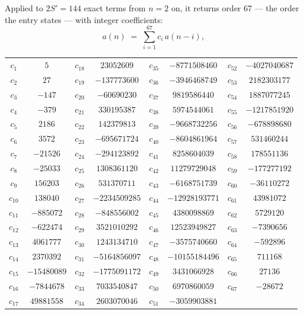 \documentclass[11pt,a4paper]{article}
\theoremstyle{plain}
\theoremstyle{definition}
\begin{document}
Applied to $2S'=144$ exact terms from $n=2$ on, it returns order $67$ --- the
order the entry states --- with integer coefficients:
\[
a(n)\;=\;\sum_{i=1}^{67}c_i\,a(n-i),
\]
\begin{center}\small
\begin{tabular}{cccccccc}
$c_{1}$ & $5$ & $c_{18}$ & $23052609$ & $c_{35}$ & $-8771508460$ & $c_{52}$ & $-4027040687$ \\
$c_{2}$ & $27$ & $c_{19}$ & $-137773600$ & $c_{36}$ & $-3946468749$ & $c_{53}$ & $2182303177$ \\
$c_{3}$ & $-147$ & $c_{20}$ & $-60690230$ & $c_{37}$ & $9819586440$ & $c_{54}$ & $1887077245$ \\
$c_{4}$ & $-379$ & $c_{21}$ & $330195387$ & $c_{38}$ & $5974544061$ & $c_{55}$ & $-1217851920$ \\
$c_{5}$ & $2186$ & $c_{22}$ & $142379813$ & $c_{39}$ & $-9668732256$ & $c_{56}$ & $-678898680$ \\
$c_{6}$ & $3572$ & $c_{23}$ & $-695671724$ & $c_{40}$ & $-8604861964$ & $c_{57}$ & $531460244$ \\
$c_{7}$ & $-21526$ & $c_{24}$ & $-294123892$ & $c_{41}$ & $8258604039$ & $c_{58}$ & $178551136$ \\
$c_{8}$ & $-25033$ & $c_{25}$ & $1308361120$ & $c_{42}$ & $11279729048$ & $c_{59}$ & $-177277192$ \\
$c_{9}$ & $156203$ & $c_{26}$ & $531370711$ & $c_{43}$ & $-6168751739$ & $c_{60}$ & $-36110272$ \\
$c_{10}$ & $138040$ & $c_{27}$ & $-2234509285$ & $c_{44}$ & $-12928193771$ & $c_{61}$ & $43981072$ \\
$c_{11}$ & $-885072$ & $c_{28}$ & $-848556002$ & $c_{45}$ & $4380098869$ & $c_{62}$ & $5729120$ \\
$c_{12}$ & $-622474$ & $c_{29}$ & $3521010292$ & $c_{46}$ & $12523949827$ & $c_{63}$ & $-7390656$ \\
$c_{13}$ & $4061777$ & $c_{30}$ & $1243134710$ & $c_{47}$ & $-3575740660$ & $c_{64}$ & $-592896$ \\
$c_{14}$ & $2370392$ & $c_{31}$ & $-5164856097$ & $c_{48}$ & $-10155184496$ & $c_{65}$ & $711168$ \\
$c_{15}$ & $-15480089$ & $c_{32}$ & $-1775091172$ & $c_{49}$ & $3431066928$ & $c_{66}$ & $27136$ \\
$c_{16}$ & $-7844678$ & $c_{33}$ & $7033540847$ & $c_{50}$ & $6970860059$ & $c_{67}$ & $-28672$ \\
$c_{17}$ & $49881558$ & $c_{34}$ & $2603070046$ & $c_{51}$ & $-3059903881$ &  &  \\
\end{tabular}
\end{center}
\end{document}
